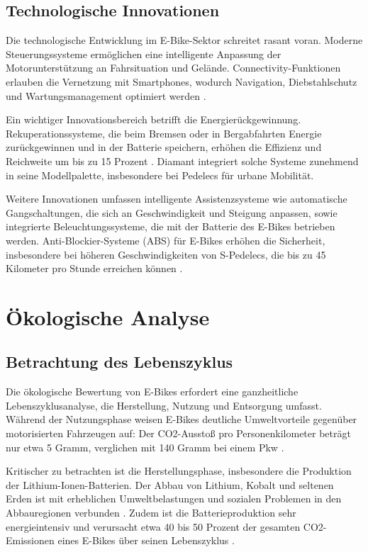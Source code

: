 \documentclass[12pt,a4paper]{article}
\begin{document}
\subsection{Technologische Innovationen}

Die technologische Entwicklung im E-Bike-Sektor schreitet rasant voran. Moderne Steuerungssysteme ermöglichen eine intelligente Anpassung der Motorunterstützung an Fahrsituation und Gelände. Connectivity-Funktionen erlauben die Vernetzung mit Smartphones, wodurch Navigation, Diebstahlschutz und Wartungsmanagement optimiert werden \cite{ebikemotion2024}.

Ein wichtiger Innovationsbereich betrifft die Energierückgewinnung. Rekuperationssysteme, die beim Bremsen oder in Bergabfahrten Energie zurückgewinnen und in der Batterie speichern, erhöhen die Effizienz und Reichweite um bis zu 15 Prozent \cite{stromvelo2023}. Diamant integriert solche Systeme zunehmend in seine Modellpalette, insbesondere bei Pedelecs für urbane Mobilität.

Weitere Innovationen umfassen intelligente Assistenzsysteme wie automatische Gangschaltungen, die sich an Geschwindigkeit und Steigung anpassen, sowie integrierte Beleuchtungssysteme, die mit der Batterie des E-Bikes betrieben werden. Anti-Blockier-Systeme (ABS) für E-Bikes erhöhen die Sicherheit, insbesondere bei höheren Geschwindigkeiten von S-Pedelecs, die bis zu 45 Kilometer pro Stunde erreichen können \cite{bosch2023}.

\clearpage
\section{Ökologische Analyse}

\subsection{Betrachtung des Lebenszyklus}

Die ökologische Bewertung von E-Bikes erfordert eine ganzheitliche Lebenszyklusanalyse, die Herstellung, Nutzung und Entsorgung umfasst. Während der Nutzungsphase weisen E-Bikes deutliche Umweltvorteile gegenüber motorisierten Fahrzeugen auf: Der CO2-Ausstoß pro Personenkilometer beträgt nur etwa 5 Gramm, verglichen mit 140 Gramm bei einem Pkw \cite{ifeu2022}.

Kritischer zu betrachten ist die Herstellungsphase, insbesondere die Produktion der Lithium-Ionen-Batterien. Der Abbau von Lithium, Kobalt und seltenen Erden ist mit erheblichen Umweltbelastungen und sozialen Problemen in den Abbauregionen verbunden \cite{oeko2023}. Zudem ist die Batterieproduktion sehr energieintensiv und verursacht etwa 40 bis 50 Prozent der gesamten CO2-Emissionen eines E-Bikes über seinen Lebenszyklus \cite{cycletest2023}.
\end{document}

